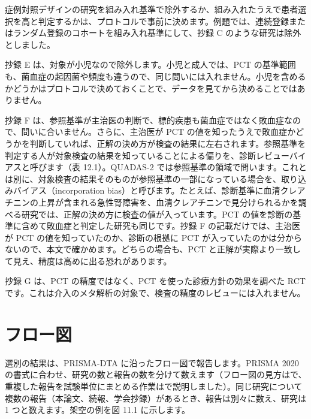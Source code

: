 症例対照デザインの研究を組み入れ基準で除外するか、組み入れたうえで患者選択を高と判定するかは、プロトコルで事前に決めます。例題では、連続登録またはランダム登録のコホートを組み入れ基準にして、抄録 C のような研究は除外としました。

抄録 E は、対象が小児なので除外します。小児と成人では、PCT の基準範囲も、菌血症の起因菌や頻度も違うので、同じ問いには入れません。小児を含めるかどうかはプロトコルで決めておくことで、データを見てから決めることではありません。

抄録 F は、参照基準が主治医の判断で、標的疾患も菌血症ではなく敗血症なので、問いに合いません。さらに、主治医が PCT の値を知ったうえで敗血症かどうかを判断していれば、正解の決め方が検査の結果に左右されます。参照基準を判定する人が対象検査の結果を知っていることによる偏りを、診断レビューバイアスと呼びます（表 12.1）。QUADAS-2 では参照基準の領域で問います。これとは別に、対象検査の結果そのものが参照基準の一部になっている場合を、取り込みバイアス（incorporation bias）と呼びます。たとえば、診断基準に血清クレアチニンの上昇が含まれる急性腎障害を、血清クレアチニンで見分けられるかを調べる研究では、正解の決め方に検査の値が入っています。PCT の値を診断の基準に含めて敗血症と判定した研究も同じです。抄録 F の記載だけでは、主治医が PCT の値を知っていたのか、診断の根拠に PCT が入っていたのかは分からないので、本文で確かめます。どちらの場合も、PCT と正解が実際より一致して見え、精度は高めに出る恐れがあります。

抄録 G は、PCT の精度ではなく、PCT を使った診療方針の効果を調べた RCT です。これは介入のメタ解析の対象で、検査の精度のレビューには入れません。

\section{フロー図}
\label{sec:11-6}

選別の結果は、PRISMA-DTA に沿ったフロー図で報告します。PRISMA 2020 の書式に合わせ、研究の数と報告の数を分けて数えます（フロー図の見方はで、重複した報告を試験単位にまとめる作業はで説明しました）。同じ研究について複数の報告（本論文、続報、学会抄録）があるとき、報告は別々に数え、研究は 1 つと数えます。架空の例を図 11.1 に示します。

